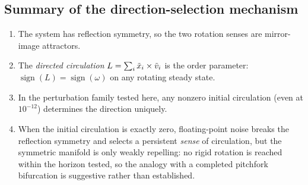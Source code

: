 \subsection{Summary of the direction-selection mechanism}
\begin{enumerate}[leftmargin=2.5em]
  \item The system has reflection symmetry, so the two rotation senses are mirror-image attractors.
  \item The \emph{directed circulation} $L=\sum_i\tilde{x}_i\times\tilde{v}_i$ is the order parameter:
        $\operatorname{sign}(L)=\operatorname{sign}(\omega)$ on any rotating steady state.
  \item In the perturbation family tested here, any nonzero initial circulation (even at
        $10^{-12}$) determines the direction uniquely.
  \item When the initial circulation is exactly zero, floating-point noise breaks the reflection
        symmetry and selects a persistent \emph{sense} of circulation, but the symmetric manifold is
        only weakly repelling: no rigid rotation is reached within the horizon tested, so the
        analogy with a completed pitchfork bifurcation is suggestive rather than established.
\end{enumerate}

